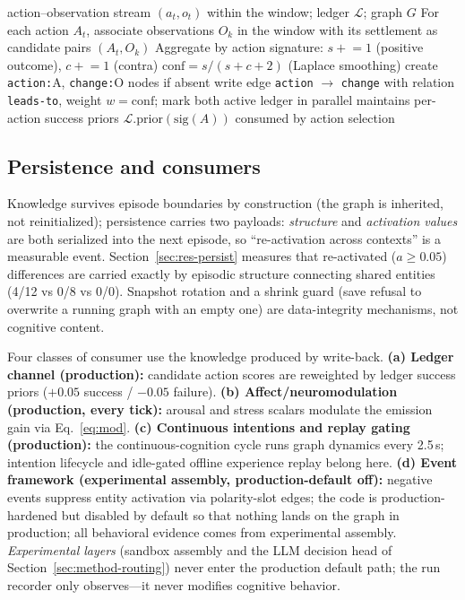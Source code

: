 \documentclass[10pt]{article}
\begin{document}
\begin{algorithm}[t]
\caption{Attribution--write-back: experience to relational knowledge}\label{alg:wb}
\begin{algorithmic}[1]
\Require action--observation stream $(a_t,o_t)$ within the window; ledger $\mathcal{L}$; graph $G$
\State For each action $A_t$, associate observations $O_k$ in the window with its settlement as candidate pairs $(A_t,O_k)$
\State Aggregate by action signature: $s\mathrel{+}=1$ (positive outcome), $c\mathrel{+}=1$ (contra)
\State $\mathrm{conf}=s/(s+c+2)$ (Laplace smoothing)
  \State create \texttt{action:}A, \texttt{change:}O nodes if absent
  \State write edge \texttt{action} $\longrightarrow$ \texttt{change} with relation \texttt{leads-to}, weight $w{=}\mathrm{conf}$; mark both active
\EndIf
\State ledger in parallel maintains per-action success priors $\mathcal{L}.\mathrm{prior}(\mathrm{sig}(A))$ consumed by action selection
\end{algorithmic}
\end{algorithm}

\subsection{Persistence and consumers}
\label{sec:arch-persist}
Knowledge survives episode boundaries by construction (the graph is inherited, not reinitialized); persistence carries two payloads: \emph{structure} and \emph{activation values} are both serialized into the next episode, so ``re-activation across contexts'' is a measurable event. Section~\ref{sec:res-persist} measures that re-activated ($a\ge0.05$) differences are carried exactly by episodic structure connecting shared entities (4/12 vs 0/8 vs 0/0). Snapshot rotation and a shrink guard (save refusal to overwrite a running graph with an empty one) are data-integrity mechanisms, not cognitive content.

Four classes of consumer use the knowledge produced by write-back. \textbf{(a) Ledger channel (production):} candidate action scores are reweighted by ledger success priors ($+0.05$ success / $-0.05$ failure). \textbf{(b) Affect/neuromodulation (production, every tick):} arousal and stress scalars modulate the emission gain via Eq.~\ref{eq:mod}. \textbf{(c) Continuous intentions and replay gating (production):} the continuous-cognition cycle runs graph dynamics every 2.5\,s; intention lifecycle and idle-gated offline experience replay belong here. \textbf{(d) Event framework (experimental assembly, production-default off):} negative events suppress entity activation via polarity-slot edges; the code is production-hardened but disabled by default so that nothing lands on the graph in production; all behavioral evidence comes from experimental assembly. \emph{Experimental layers} (sandbox assembly and the LLM decision head of Section~\ref{sec:method-routing}) never enter the production default path; the run recorder only observes---it never modifies cognitive behavior.
\end{document}
